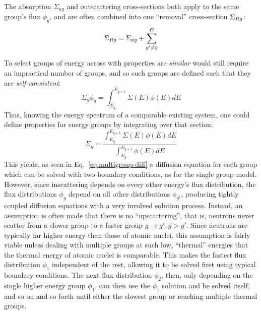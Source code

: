 \documentclass[11pt]{article} %
\begin{document}
The absorption $\Sigma_{ag}$ and outscattering cross-sections both apply to the same group's flux $\phi_g$, and are often combined into one ``removal'' cross-section $\Sigma_{Rg}$:\\
\begin{equation}
    \Sigma_{Rg} = \Sigma_{ag} + \sum_{g'\neq g}^{G}
    \label{eq:removal}
\end{equation}

To select groups of energy across with properties are \emph{similar} would still require an impractical number of groups, and so such groups are defined such that they are \emph{self-consistent}:
\begin{equation}
    \Sigma_g\phi_g = \int_{E_g}^{E_{g+1}}\Sigma(E)\phi(E)dE
    \label{eq:consistent-gxs}
\end{equation}
Thus, knowing the energy spectrum of a comparable existing system, one could define properties for energy groups by integrating over that section:
\begin{equation}
    \Sigma_g=\frac{\int_{E_g}^{E_{g+1}}\Sigma(E)\phi(E)dE}{\int_{E_g}^{E_{g+1}}\phi(E)dE}
    \label{eq:solve-gxs}
\end{equation}
This yields, as seen in Eq.~\ref{eq:multigroup-diff} a diffusion equation for each group which can be solved with two boundary conditions, as for the single group model.
However, since inscattering depends on every other energy's flux distribution, the flux distributions $\phi_g$ depend on all other distributions $\phi_{g'}$, producing tightly coupled diffusion equations with a very involved solution process.
Instead, an assumption is often made that there is no ``upscattering'', that is, neutrons never scatter from a slower group to a faster group $g\rightarrow g',g>g'$.
Since neutrons are typically far higher energy than those of atomic nuclei, this assumption is fairly viable unless dealing with multiple groups at such low, ``thermal'' energies that the thermal energy of atomic nuclei is comparable.
This makes the fastest flux distribution $\phi_1$ independent of the rest, allowing it to be solved first using typical boundary conditions.
The next flux distribution $\phi_2$, then, only depending on the single higher energy group $\phi_1$, can then use the $\phi_1$ solution and be solved itself, and so on and so forth until either the slowest group or reaching multiple thermal groups.\\
\end{document}
